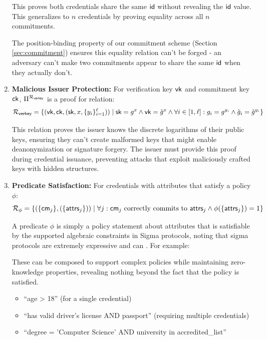 \begin{enumerate}
    This proves both credentials share the same $\mathsf{id}$ without revealing the $\mathsf{id}$ value. This generalizes to $n$ credentials by proving equality across all $n$ commitments.
    
    The position-binding property of our commitment scheme (Section \ref{sec:commitment}) ensures this equality relation can't be forged - an adversary can't make two commitments appear to share the same $\mathsf{id}$ when they actually don't.

    \item \textbf{Malicious Issuer Protection:} For verification key $\mathsf{vk}$ and commitment key $\mathsf{ck}$, $\Pi^{\mathcal{R}_{\mathsf{verkey}}}$ is a proof for relation:
    \[
    \mathcal{R}_{\mathsf{verkey}} = \{(\mathsf{vk}, \mathsf{ck}, (\mathsf{sk}, x, \{y_i\}_{i=1}^{\ell})) \mid \mathsf{sk} = g^x \wedge \mathsf{vk} = \tilde{g}^x \wedge 
    \forall i \in [1,\ell]: g_i = g^{y_i} \wedge \tilde{g}_i = \tilde{g}^{y_i} \}
    \]
    
    This relation proves the issuer knows the discrete logarithms of their public keys, ensuring they can't create malformed keys that might enable deanonymization or signature forgery. The issuer must provide this proof during credential issuance, preventing attacks that exploit maliciously crafted keys with hidden structures.     

     \item \textbf{Predicate Satisfaction:} For credentials with attributes that satisfy a policy $\phi$:
    \[
    \mathcal{R}_{\phi} = \{(\{\mathsf{cm}_j\}, (\{\mathsf{attrs}_j\})) \mid \forall j: \mathsf{cm}_j \text{ correctly commits to } \mathsf{attrs}_j \wedge
    \phi(\{\mathsf{attrs}_j\}) = 1 \}
    \]
    
    A predicate $\phi$ is simply a policy statement about attributes that is satisfiable by the supported algebraic constraints in Sigma protocols, noting that sigma protocols are extremely expressive and can  . For example:

    These can be composed to support complex policies while maintaining zero-knowledge properties, revealing nothing beyond the fact that the policy is satisfied.
    \begin{itemize}
    \item ``age > 18'' (for a single credential)
    \item ``has valid driver's license AND passport'' (requiring multiple credentials)
    \item ``degree = 'Computer Science' AND university in accredited\_list''
    \end{itemize}
    

\end{enumerate}
